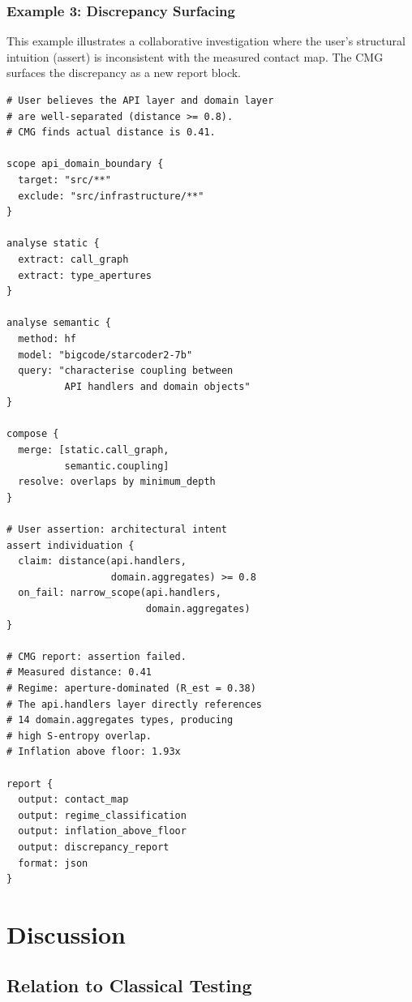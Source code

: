 \documentclass[12pt,a4paper,twocolumn]{article}
\theoremstyle{plain}
\theoremstyle{definition}
\theoremstyle{remark}
\begin{document}
\subsubsection{Example 3: Discrepancy Surfacing}

This example illustrates a collaborative investigation where the user's
structural intuition (assert) is inconsistent with the measured contact map.
The CMG surfaces the discrepancy as a new report block.

\begin{lstlisting}[caption={Discrepancy between user model and measured contact map},
                   label={lst:discrepancy}]
# User believes the API layer and domain layer
# are well-separated (distance >= 0.8).
# CMG finds actual distance is 0.41.

scope api_domain_boundary {
  target: "src/**"
  exclude: "src/infrastructure/**"
}

analyse static {
  extract: call_graph
  extract: type_apertures
}

analyse semantic {
  method: hf
  model: "bigcode/starcoder2-7b"
  query: "characterise coupling between
          API handlers and domain objects"
}

compose {
  merge: [static.call_graph,
          semantic.coupling]
  resolve: overlaps by minimum_depth
}

# User assertion: architectural intent
assert individuation {
  claim: distance(api.handlers,
                  domain.aggregates) >= 0.8
  on_fail: narrow_scope(api.handlers,
                        domain.aggregates)
}

# CMG report: assertion failed.
# Measured distance: 0.41
# Regime: aperture-dominated (R_est = 0.38)
# The api.handlers layer directly references
# 14 domain.aggregates types, producing
# high S-entropy overlap.
# Inflation above floor: 1.93x

report {
  output: contact_map
  output: regime_classification
  output: inflation_above_floor
  output: discrepancy_report
  format: json
}
\end{lstlisting}

\section{Discussion}
\label{sec:discussion}

\subsection{Relation to Classical Testing}
\end{document}
